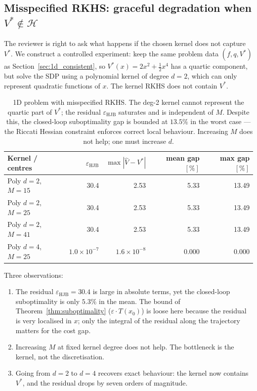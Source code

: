 \documentclass[11pt]{article}
\begin{document}
\subsection{Misspecified RKHS: graceful degradation when $V^*\notin\mathcal{H}$}
\label{sec:1d_lossy}

The reviewer is right to ask what happens if the chosen kernel does not capture $V^*$. We construct a controlled experiment: keep the same problem data $(f, q, V^*)$ as Section~\ref{sec:1d_consistent}, so $V^*(x) = 2x^2 + \tfrac12 x^4$ has a quartic component, but solve the SDP using a polynomial kernel of degree $d=2$, which can only represent quadratic functions of $x$. The kernel RKHS does not contain $V^*$.

\begin{table}[h]
\centering
\caption{1D problem with misspecified RKHS. The deg-2 kernel cannot represent the quartic part of $V^*$; the residual $\varepsilon_{\mathrm{HJB}}$ saturates and is independent of $M$. Despite this, the closed-loop suboptimality gap is bounded at $13.5\%$ in the worst case --- the Riccati Hessian constraint enforces correct local behaviour. Increasing $M$ does not help; one must increase $d$.}
\label{tab:1d_lossy}
\begin{tabular}{lrrrr}
\toprule
Kernel / centres & $\varepsilon_{\mathrm{HJB}}$ & $\max|\hat V - V^*|$ & mean gap $[\%]$ & max gap $[\%]$ \\
\midrule
Poly $d=2$, $M=15$ & 30.4 & 2.53 & 5.33 & 13.49 \\
Poly $d=2$, $M=25$ & 30.4 & 2.53 & 5.33 & 13.49 \\
Poly $d=2$, $M=41$ & 30.4 & 2.53 & 5.33 & 13.49 \\
Poly $d=4$, $M=25$ & $1.0\times 10^{-7}$ & $1.6\times 10^{-8}$ & $0.000$ & $0.000$ \\
\bottomrule
\end{tabular}
\end{table}

Three observations:

\begin{enumerate}
\item The residual $\varepsilon_{\mathrm{HJB}} = 30.4$ is large in absolute terms, yet the closed-loop suboptimality is only $5.3\%$ in the mean. The bound of Theorem~\ref{thm:suboptimality} ($\varepsilon \cdot T(x_0)$) is loose here because the residual is very localised in $x$; only the integral of the residual along the trajectory matters for the cost gap.
\item Increasing $M$ at fixed kernel degree does not help. The bottleneck is the kernel, not the discretisation.
\item Going from $d=2$ to $d=4$ recovers exact behaviour: the kernel now contains $V^*$, and the residual drops by seven orders of magnitude.
\end{enumerate}
\end{document}

